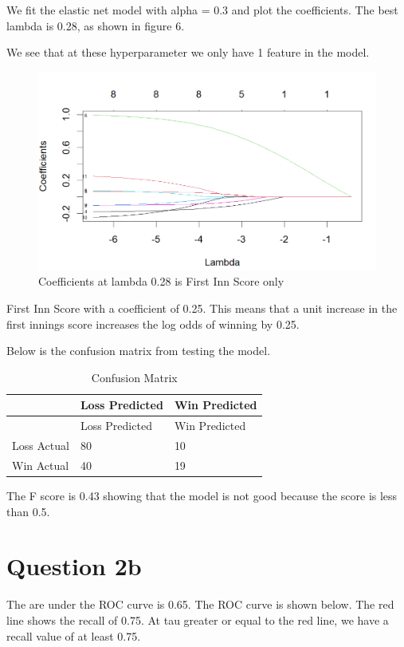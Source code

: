 \documentclass[
]{article}
\begin{document}
We fit the elastic net model with alpha = 0.3 and plot the coefficients.
The best lambda is 0.28, as shown in figure 6.

We see that at these hyperparameter we only have 1 feature in the model.

\begin{figure}
\centering
\includegraphics{coef_ipl.png}
\caption{Coefficients at lambda 0.28 is First Inn Score only}
\end{figure}

First Inn Score with a coefficient of 0.25. This means that a unit
increase in the first innings score increases the log odds of winning by
0.25.

Below is the confusion matrix from testing the model.

\begin{longtable}[]{@{}lll@{}}
\caption{Confusion Matrix}\tabularnewline
\toprule\noalign{}
& Loss Predicted & Win Predicted \\
\midrule\noalign{}
\endfirsthead
\toprule\noalign{}
& Loss Predicted & Win Predicted \\
\midrule\noalign{}
\endhead
\bottomrule\noalign{}
\endlastfoot
Loss Actual & 80 & 10 \\
Win Actual & 40 & 19 \\
\end{longtable}

The F score is 0.43 showing that the model is not good because the score
is less than 0.5.

\hypertarget{question-2b}{%
\section{Question 2b}\label{question-2b}}

The are under the ROC curve is 0.65. The ROC curve is shown below. The
red line shows the recall of 0.75. At tau greater or equal to the red
line, we have a recall value of at least 0.75.
\end{document}
